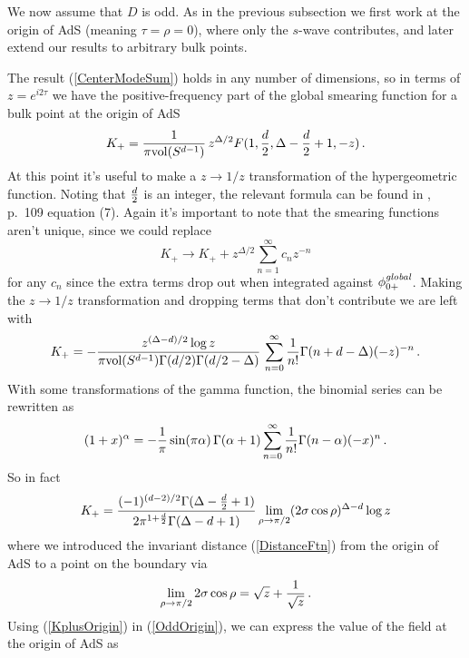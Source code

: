 \documentclass[12pt]{article}
\newcommand{\phinotg} [1]{{\phi_{0#1}^{\it global}}}
\begin{document}
We now assume that $D$ is odd.  As in the previous subsection we first
work at the origin of AdS (meaning $\tau = \rho = 0$), where only the
$s$-wave contributes, and later extend our results to arbitrary bulk
points.

The result (\ref{CenterModeSum}) holds in any number of dimensions, so in terms of $z = e^{i 2 \tau}$ we have the
positive-frequency part of the global smearing function for a bulk point at the origin of AdS
\[
K_+ = {1 \over \pi {\rm vol}(S^{d-1})} \, z^{\Delta / 2} F(1, {d \over 2},\Delta - {d \over 2} + 1,-z)\,.
\]
At this point it's useful to make a $z \rightarrow 1/z$ transformation of the hypergeometric function.  Noting that
${d \over 2}$ is an integer, the relevant formula can be found in \cite{Bateman}, p.~109 equation (7).  Again it's
important to note that the smearing functions aren't unique, since we could replace
\begin{equation}
K_+ \rightarrow K_+ + z^{\Delta/2} \sum_{n = 1}^\infty c_n z^{-n}
\end{equation}
for any $c_n$ since the extra terms drop out when integrated against $\phinotg{+}$.  Making the $z \rightarrow 1/z$
transformation and dropping terms that don't contribute we are left with
\begin{equation}
K_+ = - {z^{(\Delta - d)/2} \log z \over \pi {\rm vol}(S^{d-1}) \Gamma(d/2) \Gamma(d/2 - \Delta)} \,
\sum_{n = 0}^\infty {1 \over n!} \Gamma(n + d - \Delta) (-z)^{-n}\,.
\end{equation}
With some transformations of the gamma function, the binomial series can be rewritten as
\begin{equation}
(1 + x)^\alpha = - {1 \over \pi} \sin (\pi \alpha) \, \Gamma(\alpha + 1) \sum_{n = 0}^\infty {1 \over n!} \Gamma(n - \alpha)
(-x)^n\,.
\end{equation}
So in fact
\begin{equation}
\label{KplusOrigin}
K_+ = {(-1)^{(d - 2)/2} \Gamma(\Delta - {d \over 2} + 1) \over 2 \pi^{1 + {d \over 2}} \Gamma(\Delta - d + 1)}
\lim_{\rho \rightarrow \pi/2} (2 \sigma \cos \rho)^{\Delta - d} \log z
\end{equation}
where we introduced the invariant distance (\ref{DistanceFtn}) from the origin of AdS to a point on
the boundary via
\begin{equation}
\lim_{\rho \rightarrow \pi/2} 2 \sigma \cos \rho = \sqrt{z} + {1 \over \sqrt{z}}\,.
\end{equation}
Using (\ref{KplusOrigin}) in (\ref{OddOrigin}), we can express the value of the field at the origin of AdS as
\end{document}
